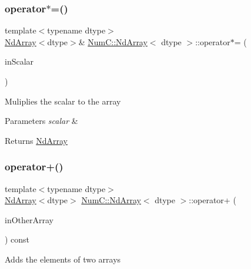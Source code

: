 \subsubsection{\texorpdfstring{operator$\ast$=()}{operator*=()}\hspace{0.1cm}{\footnotesize\ttfamily [2/2]}}
{\footnotesize\ttfamily template$<$typename dtype$>$ \\
\mbox{\hyperlink{class_num_c_1_1_nd_array}{Nd\+Array}}$<$dtype$>$\& \mbox{\hyperlink{class_num_c_1_1_nd_array}{Num\+C\+::\+Nd\+Array}}$<$ dtype $>$\+::operator$\ast$= (\begin{DoxyParamCaption}\item[{dtype}]{in\+Scalar }\end{DoxyParamCaption})\hspace{0.3cm}{\ttfamily [inline]}}

Muliplies the scalar to the array


\begin{DoxyParams}{Parameters}
{\em scalar} & \\
\hline
\end{DoxyParams}
\begin{DoxyReturn}{Returns}
\mbox{\hyperlink{class_num_c_1_1_nd_array}{Nd\+Array}} 
\end{DoxyReturn}
\mbox{\label{class_num_c_1_1_nd_array_a910f4bbf7dc623d98a633c9490eb83c1}} 
\subsubsection{\texorpdfstring{operator+()}{operator+()}\hspace{0.1cm}{\footnotesize\ttfamily [1/2]}}
{\footnotesize\ttfamily template$<$typename dtype$>$ \\
\mbox{\hyperlink{class_num_c_1_1_nd_array}{Nd\+Array}}$<$dtype$>$ \mbox{\hyperlink{class_num_c_1_1_nd_array}{Num\+C\+::\+Nd\+Array}}$<$ dtype $>$\+::operator+ (\begin{DoxyParamCaption}\item[{const \mbox{\hyperlink{class_num_c_1_1_nd_array}{Nd\+Array}}$<$ dtype $>$ \&}]{in\+Other\+Array }\end{DoxyParamCaption}) const\hspace{0.3cm}{\ttfamily [inline]}}

Adds the elements of two arrays


